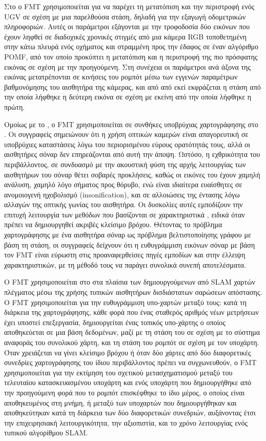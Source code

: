 Στο \cite{Kazik2011} ο FMT χρησιμοποιείται για να παρέχει τη μετατόπιση και την
περιστροφή ενός UGV σε σχέση με μια παρελθούσα στάση, δηλαδή για την εξαγωγή
οδομετρικών πληροφοριών. Αυτές οι παράμετροι εξάγονται με την τροφοδοσία δύο
εικόνων που έχουν ληφθεί σε διαδοχικές χρονικές στιγμές από μια κάμερα RGB
τοποθετημένη στην κάτω πλευρά ενός οχήματος και στραμμένη προς την έδαφος σε
έναν αλγόριθμο POMF, από τον οποίο προκύπτει η μετατόπιση και η περιστροφή της
πιο πρόσφατης εικόνας σε σχέση με την προηγούμενη. Στη συνέχεια οι παράμετροι
ανά άξονα της εικόνας μετατρέπονται σε κινήσεις του ρομπότ μέσω των εγγενών
παραμέτρων βαθμονόμησης του αισθητήρα της κάμερας, και από από εκεί εκφράζεται
η στάση από την οποία λήφθηκε η δεύτερη εικόνα σε σχέση με εκείνη από την οποία
λήφθηκε η πρώτη.

Ομοίως με το \cite{Bulow2010}, ο FMT χρησιμοποιείται σε συνθήκες υποβρύχιας
χαρτογράφησης στο \cite{Hurtos2012}. Οι συγγραφείς σημειώνουν ότι η χρήση
οπτικών καμερών είναι απαγορευτική σε υποβρύχιες καταστάσεις λόγω του
περιορισμένου εύρους ορατότητάς τους, αλλά οι αισθητήρες σόναρ δεν επηρεάζονται
από αυτή την άποψη. Ωστόσο, η εχθρικότητα του περιβάλλοντος, σε συνδυασμό με
την ακουστική φύση της αρχής λειτουργίας των αισθητήρων του σόναρ θέτει σοβαρές
προκλήσεις, καθώς οι εικόνες του έχουν χαμηλή ανάλυση, χαμηλό λόγο σήματος προς
θόρυβο, ενώ είναι ιδιαίτερα ευαίσθητες σε ανομοιογενή ηχοβολισμό
(insonification), και σε αλλοιώσεις της έντασης λόγω αλλαγών της οπτικής γωνίας
του αισθητήρα. Οι δυσκολίες αυτές εμποδίζουν την επιτυχή λειτουργία των μεθόδων
που βασίζονται σε χαρακτηριστικά \cite{Kim2005,Lowe2004}, ειδικά όταν πρέπει
να δημιουργηθεί ακριβές κλείσιμο βρόχου. Θέτοντας το πρόβλημα χαρτογράφησης
με ένα αισθητήρα σόναρ ως πρόβλημα βελτιστοποίησης γράφου με βάση τη στάση, οι
συγγραφείς δείχνουν ότι η ευθυγράμμιση εικόνων σόναρ με βάση τον FMT είναι
εύρωστη στις προαναφερθείσες πηγές εμποδίων και στην έλλειψη χαρακτηριστικών,
με τη μέθοδό τους να παράγει συνολικά συνεπή αποτελέσματα.

Ο FMT χρησιμοποιείται στο \cite{Oberlander2013} στα πλαίσια των δημιουργούμενων
από SLAM χαρτών πλέγματος μέσω της χρήσης τυπικών αισθητήρων δισδιάστατων
σαρώσεων απόστασης. Ο FMT χρησιμοποιείται για την ευθυγράμμιση υπο-χαρτών
μεταξύ τους: κατά τη διάρκεια της χαρτογράφησης, κάθε φορά που ένας σταθερός
αριθμός νέων μετρήσεων έχει υποστεί επεξεργασία, δημιουργείται ένας τοπικός
υπο-χάρτης ο οποίος αποθηκεύεται σε μια βάση δεδομένων, μαζί με τη στάση του σε
σχέση με το σύστημα αναφοράς του συνολικού χάρτη, και τη στάση του ρομπότ σε
σχέση με τον υποχάρτη. Όταν χρειάζεται να γίνει κλείσιμο βρόχου ή όταν δύο
χάρτες από δύο διαφορετικές συνεδρίες χαρτογράφησης του ίδιου περιβάλλοντος
πρέπει να συγχωνευθούν, ο FMT χρησιμοποιείται για την εκτίμηση του σχετικού
μετασχηματισμού μεταξύ του τελευταίου κατασκευασμένου υποχάρτη και ενός
υποχάρτη που δημιουργήθηκε από την προηγούμενη φορά που το ρομπότ επισκέφθηκε
το ίδιο μέρος, ο οποίος είναι αποθηκευμένος στη μνήμη, ή μεταξύ των υποχαρτών
που δημιουργήθηκαν και αποθηκεύτηκαν κατά τη διάρκεια των δύο διαφορετικών
συνεδριών, αυξάνοντας έτσι την επιχειρησιακή λειτουργικότητα, την αξιοπιστία,
και το χρόνο λειτουργίας ενός τυπικού αλγορίθμου SLAM.

